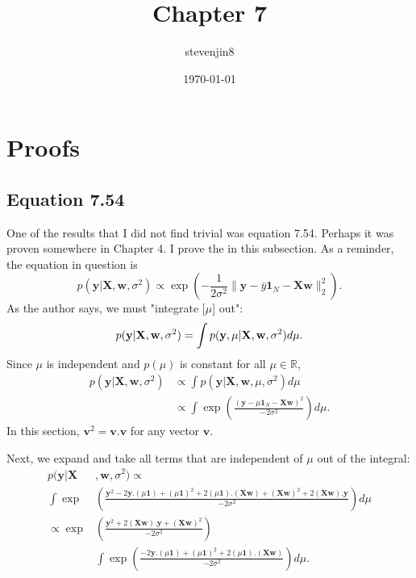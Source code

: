 \documentclass[a4paper,11pt]{article}
\title{Chapter 7}
\author{stevenjin8}
\date{\today}
\begin{document}
\maketitle
\section{Proofs}
\subsection*{Equation 7.54}
One of the results that I did not find trivial was equation 7.54.
Perhaps it was proven somewhere in Chapter 4.
I prove the in this subsection. As a reminder, the equation in question is
\[
    p(\mathbf{y}|\mathbf{X}, \mathbf{w}, \sigma^2) \propto
\exp(-\frac{1}{2\sigma^2}\|\mathbf{y} - \bar{y}\mathbf{1}_N - \mathbf{Xw}\|_2^2).
\]
As the author says, we must "integrate [$\mu$] out":
\[
    p(\mathbf{y}|\mathbf{X}, \mathbf{w}, \sigma^2) = 
    \int p(\mathbf{y},\mu|\mathbf{X}, \mathbf{w}, \sigma^2) d\mu.\\
\]
Since $\mu$ is independent and $p(\mu)$ is constant for all $\mu \in \mathbb{R}$,
\begin{align*}
p(\mathbf{y}|\mathbf{X}, \mathbf{w}, \sigma^2) & \propto
\int p(\mathbf{y}|\mathbf{X}, \mathbf{w}, \mu, \sigma^2)d\mu \\
& \propto \int\exp\left(\frac{
\left(\mathbf{y} - \mu\mathbf{1}_N -\mathbf{Xw}\right)^2 
}{-2\sigma^2}\right)d\mu.
\end{align*}
In this section, $\mathbf{v}^2 = \mathbf{v}.\mathbf{v}$ for any vector $\mathbf{v}$.

Next, we expand and take all terms that are independent of $\mu$ out of the
integral:
\begin{align*}
p(\mathbf{y}|\mathbf{X}&, \mathbf{w}, \sigma^2) \propto \\
\int\exp&\left(\frac{\mathbf{y}^2 - 2\mathbf{y}.(\mu\mathbf{1})
+(\mu\mathbf{1})^2 + 2(\mu\mathbf{1}).(\mathbf{Xw})
+ (\mathbf{Xw})^2 + 2(\mathbf{Xw}).\mathbf{y}}
{-2\sigma^2}\right) d\mu \\
\propto \exp&\left(\frac{\mathbf{y}^2 + 2(\mathbf{Xw}).\mathbf{y} +
(\mathbf{Xw})^2}{-2\sigma^2}\right) \\
&\int\exp\left(\frac{-2\mathbf{y}.(\mu\mathbf{1}) + (\mu\mathbf{1})^2 + 2
(\mu\mathbf{1}).(\mathbf{Xw})}
{-2\sigma^2}\right)d\mu.
\end{align*}
\end{document}
